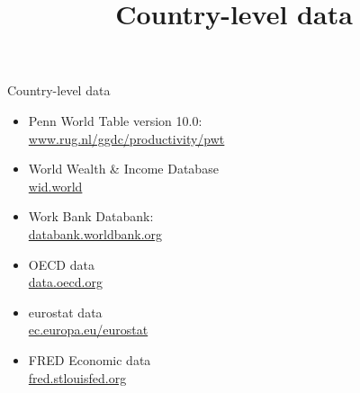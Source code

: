 \documentclass[hyperref={pdfpagelabels=false}]{beamer}
\begin{document}
\title[]  
{Country-level data}


\author 
{}

\institute{}






\date
{}


\begin{frame}{}
	\titlepage
\end{frame}





\begin{frame}{Country-level data}
\begin{itemize} 
\item Penn World Table version 10.0: \\ \href{https://www.rug.nl/ggdc/productivity/pwt/}{www.rug.nl/ggdc/productivity/pwt}  
\vspace{0.2cm}
\item World Wealth \& Income Database \\ \href{https://wid.world/}{wid.world}
\vspace{0.2cm}
\item Work Bank Databank: \\ \href{https://databank.worldbank.org/}{databank.worldbank.org}  
\vspace{0.2cm}
\item OECD data \\ \href{https://data.oecd.org/}{data.oecd.org}
\vspace{0.2cm}
\item eurostat data \\ \href{https://ec.europa.eu/eurostat/data/database}{ec.europa.eu/eurostat}
\vspace{0.2cm}
\item FRED Economic data \\ \href{https://fred.stlouisfed.org/tags/series}{fred.stlouisfed.org}





\end{itemize}
\end{frame}
\end{document}
